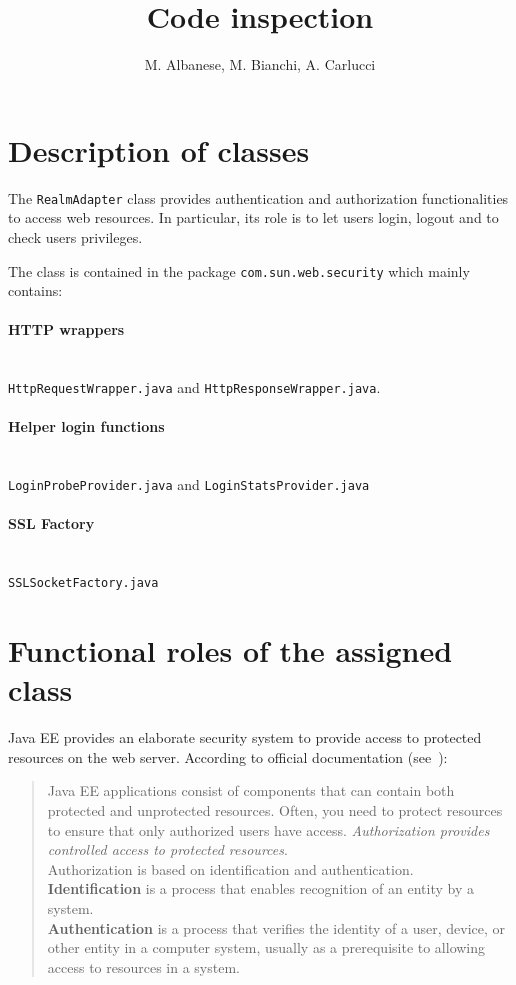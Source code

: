 \documentclass[a4paper, 11pt]{article}
\newcommand{\code}[1]{\texttt{#1}}
\begin{document}
\title{Code inspection}


\author{M. Albanese, M. Bianchi, A. Carlucci}

\maketitle
\newpage{}
\tableofcontents{}

\newpage{}


\section{Description of classes}

The \code{RealmAdapter} class provides authentication and authorization functionalities
to access web resources. In particular, its role is to let users login,
logout and to check users privileges.

The class is contained in the package \code{com.sun.web.security} which mainly
contains:
\paragraph{HTTP wrappers} \mbox{} \\  
\code{HttpRequestWrapper.java} and \code{HttpResponseWrapper.java}.


\paragraph{Helper login functions} \mbox{} \\ 
\code{LoginProbeProvider.java} and \code{LoginStatsProvider.java}

\paragraph{SSL Factory} \mbox{} \\ 
\code{SSLSocketFactory.java} 

\newpage
\section{Functional roles of the assigned class}
Java EE provides an elaborate security system to provide access to protected resources on the web server. According to official documentation (see~\cite{bib:docurl}):

\begin{quotation}
    Java EE applications consist of components that can contain both protected and unprotected resources. Often, you need to protect resources to ensure that only authorized users have access. \emph{Authorization provides controlled access to protected resources}. \\
    Authorization is based on identification and authentication. \\
    \textbf{Identification} is a process that enables recognition of an entity by a system. \\
    \textbf{Authentication} is a process that verifies the identity of a user, device, or other entity in a computer system, usually as a prerequisite to allowing access to resources in a system.
\end{quotation}
\end{document}
